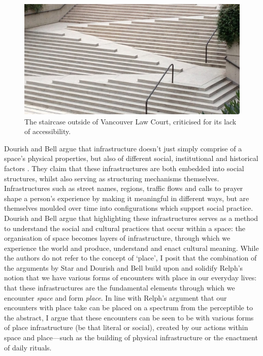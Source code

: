 \begin{figure}
  \centering
  \includegraphics[width=0.8\columnwidth]{images/chapter02/stairs.jpg}
  \caption[Vancouver Law Court staircase]{The staircase outside of Vancouver Law Court, criticised for its lack of accessibility.}
  \label{fig:stairs}
\end{figure}

Dourish and Bell argue that infrastructure doesn't just simply comprise of a space's physical properties, but also of different social, institutional and historical factors \citep{Dourish2007, Dourish2006}. They claim that these infrastructures are both embedded into social structures, whilst also serving as structuring mechanisms themselves. Infrastructures such as street names, regions, traffic flows and calls to prayer shape a person's experience by making it meaningful in different ways, but are themselves moulded over time into configurations which support social practice. Dourish and Bell argue that highlighting these infrastructures serves as a method to understand the social and cultural practices that occur within a space: the organisation of space becomes layers of infrastructure, through which we experience the world and produce, understand and enact cultural meaning. While the authors do not refer to the concept of `place', I posit that the combination of the arguments by Star and Dourish and Bell build upon and solidify Relph's notion that we have various forms of encounters with place in our everyday lives: that these infrastructures are the fundamental elements through which we encounter \textit{space} and form \textit{place}. In line with Relph's argument that our encounters with place take can be placed on a spectrum from the perceptible to the abstract, I argue that these encounters can be seen to be with various forms of place infrastructure (be that literal or social), created by our actions within space and place---such as the building of physical infrastructure or the enactment of daily rituals.

